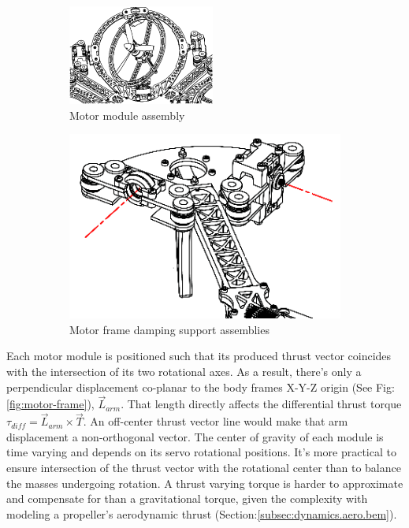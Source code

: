 \begin{figure}[hbtp]
\begin{subfigure}{.5\textwidth}
\centering
\includegraphics[width=\textwidth]{figs/motor-assembly}
\caption{Motor module assembly}
\label{fig:motor-assembly}
\end{subfigure}
\begin{subfigure}{.5\textwidth}
\centering
\includegraphics[width=\textwidth]{figs/motor-support}
\caption{Motor frame damping support assemblies}
\label{fig:motor_support}
\end{subfigure}
\caption{}
\end{figure}
Each motor module is positioned such that its produced thrust vector coincides with the intersection of its two rotational axes. As a result, there's only a perpendicular displacement co-planar to the body frames X-Y-Z origin (See Fig:\ref{fig:motor-frame}), $\vec{L}_{arm}$. That length directly affects the differential thrust torque $\tau_{diff}=\vec{L}_{arm}\times\vec{T}$. An off-center thrust vector line would make that arm displacement a non-orthogonal vector. The center of gravity of each module is time varying and depends on its servo rotational positions. It's more practical to ensure intersection of the thrust vector with the rotational center than to balance the masses undergoing rotation. A thrust varying torque is harder to approximate and compensate for than a gravitational torque, given the complexity with modeling a propeller's aerodynamic thrust (Section:\ref{subsec:dynamics.aero.bem}).
